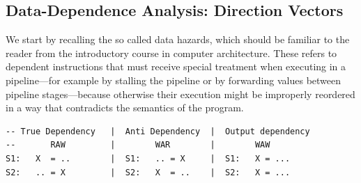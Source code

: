 \documentclass[acmsmall,review]{acmart}\settopmatter{printfolios=true,printccs=false,printacmref=false}
\begin{document}
\subsection{Data-Dependence Analysis: Direction Vectors}
\label{subsec:dir-vct}

We start by recalling the so called data hazards, which should
be familiar to the reader from the introductory course in 
computer architecture. These refers to dependent instructions
that must receive special treatment when executing in a 
pipeline---for example by stalling the pipeline or by forwarding 
values between pipeline stages---because otherwise their execution
might be improperly reordered in a way that contradicts the
semantics of the program.   

\begin{lstlisting}[mathescape=true]
-- True Dependency   |  Anti Dependency  |  Output dependency
--       RAW         |        WAR        |        WAW
S1:   X  = ..        |  S1:   .. = X     |  S1:   X = ...            
S2:   .. = X         |  S2:   X  = ..    |  S2:   X = ...
\end{lstlisting}\vspace{-2ex}
\end{document}
